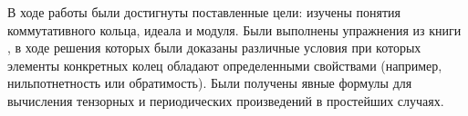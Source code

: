 В ходе работы были достигнуты поставленные цели: изучены понятия коммутативного кольца, идеала и модуля. Были выполнены упражнения из
книги \cite{A-M}, в ходе решения которых были доказаны различные условия при которых элементы конкретных колец 
обладают определенными свойствами (например, нильпотнетность или обратимость). 
Были получены явные формулы для вычисления тензорных и периодических произведений в простейших случаях.